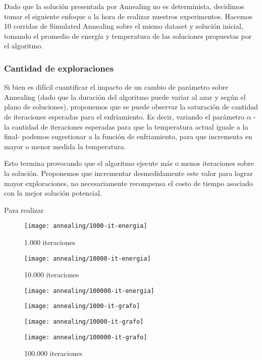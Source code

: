 Dado que la solución presentada por Annealing no es determinista, decidimos tomar el siguiente enfoque a la hora de realizar nuestros experimentos.
Hacemos 10 corridas de Simulated Annealing sobre el mismo dataset y solución inicial, tomando el promedio de energía y temperatura de las soluciones propuestas por el algoritmo.

\subsubsection{Cantidad de exploraciones}
Si bien es difícil cuantificar el impacto de un cambio de parámetro sobre Annealing (dado que la duración del algoritmo puede variar al azar y según el plano de soluciones), proponemos que se puede observar la saturación de cantidad de iteraciones esperadas para el enfriamiento. Es decir, variando el parámetro $\alpha$ -la cantidad de iteraciones esperadas para que la temperatura actual iguale a la final- podemos sugestionar a la función de enfriamiento, para que incrementa en mayor o menor medida la temperatura.

Esto termina provocando que el algoritmo ejecute más o menos iteraciones sobre la solución.
Proponemos que incrementar desmedidamente este valor para lograr mayor exploraciones, no necesariamente recompensa el costo de tiempo asociado con la mejor solución potencial. 

Para realizar
\begin{figure}[H]
	\centering
	\begin{minipage}[t]{.30\textwidth}
		\centering
		\texttt{[image: annealing/1000-it-energia]}
		\caption{1.000 iteraciones}
	\end{minipage}\qquad
	\centering
	\begin{minipage}[t]{.30\textwidth}
		\centering
		\texttt{[image: annealing/10000-it-energia]}
		\caption{10.000 iteraciones}
	\end{minipage}\qquad
	\centering
	\begin{minipage}[t]{.30\textwidth}
		\centering
		\texttt{[image: annealing/100000-it-energia]}
		\caption{100.000 iteraciones}
	\end{minipage}\qquad
	\centering
	\begin{minipage}[t]{.30\textwidth}
		\centering
		\texttt{[image: annealing/1000-it-grafo]}
	\end{minipage}\qquad
	\centering
	\begin{minipage}[t]{.30\textwidth}
		\centering
		\texttt{[image: annealing/10000-it-grafo]}
	\end{minipage}\qquad
	\centering
	\begin{minipage}[t]{.30\textwidth}
		\centering
		\texttt{[image: annealing/100000-it-grafo]}
	\end{minipage}\qquad
\end{figure}	

